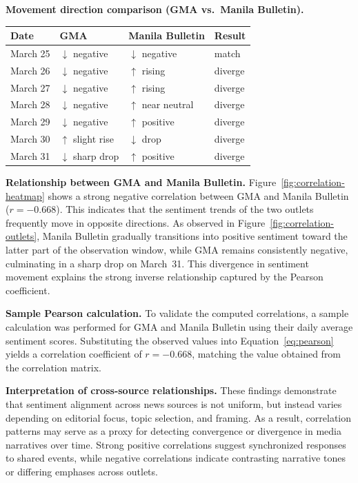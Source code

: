 \documentclass[sigconf, nonacm]{acmart}
\begin{document}
\textbf{Movement direction comparison (GMA vs.\ Manila Bulletin).}
\begin{table}[h]
  \centering
  \small
  \begin{tabular}{p{}p{}p{}p{}}
    \toprule
    Date & GMA & Manila Bulletin & Result \\
    \midrule
    March 25 & $\downarrow$ negative & $\downarrow$ negative & match \\
    March 26 & $\downarrow$ negative & $\uparrow$ rising & diverge \\
    March 27 & $\downarrow$ negative & $\uparrow$ rising & diverge \\
    March 28 & $\downarrow$ negative & $\uparrow$ near neutral & diverge \\
    March 29 & $\downarrow$ negative & $\uparrow$ positive & diverge \\
    March 30 & $\uparrow$ slight rise & $\downarrow$ drop & diverge \\
    March 31 & $\downarrow$ sharp drop & $\uparrow$ positive & diverge \\
    \bottomrule
  \end{tabular}
\end{table}

\textbf{Relationship between GMA and Manila Bulletin.}
Figure~\ref{fig:correlation-heatmap} shows a strong negative correlation between GMA and Manila Bulletin ($r=-0.668$). This indicates that the sentiment trends of the two outlets frequently move in opposite directions. As observed in Figure~\ref{fig:correlation-outlets}, Manila Bulletin gradually transitions into positive sentiment toward the latter part of the observation window, while GMA remains consistently negative, culminating in a sharp drop on March~31. This divergence in sentiment movement explains the strong inverse relationship captured by the Pearson coefficient.

\textbf{Sample Pearson calculation.}
To validate the computed correlations, a sample calculation was performed for GMA and Manila Bulletin using their daily average sentiment scores. Substituting the observed values into Equation~\ref{eq:pearson} yields a correlation coefficient of $r = -0.668$, matching the value obtained from the correlation matrix.

\textbf{Interpretation of cross-source relationships.}
These findings demonstrate that sentiment alignment across news sources is not uniform, but instead varies depending on editorial focus, topic selection, and framing. 
As a result, correlation patterns may serve as a proxy for detecting convergence or divergence in media narratives over time. Strong positive correlations suggest synchronized responses to shared events, while negative correlations indicate contrasting narrative tones or differing emphases across outlets.
\end{document}
